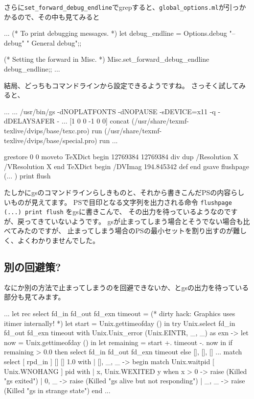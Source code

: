 \documentclass[mingoth,a4paper]{jsarticle}
\begin{document}
さらに\verb|set_forward_debug_endline|でgrepすると、\verb|global_options.ml|が引っかかるので、その中も見てみると

\begin{commandline}
...
(* To print debugging messages. *)
let debug_endline = Options.debug "--debug" " General debug";;

(* Setting the forward in Misc. *)
Misc.set_forward_debug_endline debug_endline;;
...
\end{commandline}

結局、どっちもコマンドラインから設定できるようですね。
さっそく試してみると、

\begin{commandline}
...
...
/usr/bin/gs
-dNOPLATFONTS
-dNOPAUSE
-sDEVICE=x11
-q
-dDELAYSAFER
-
...
[1 0 0 -1 0 0] concat
(/usr/share/texmf-texlive/dvips/base/texc.pro) run
(/usr/share/texmf-texlive/dvips/base/special.pro) run
...

grestore
0 0 moveto
TeXDict begin 12769384 12769384 div dup /Resolution X /VResolution X end
TeXDict begin /DVImag 194.845342 def end
gsave
flushpage (...
) print flush 
\end{commandline}

たしかにgsのコマンドラインらしきものと、それから書きこんだPSの内容らしいものが見えてます。
PSで目印となる文字列を出力される命令 \verb|flushpage (...) print flush| をgsに書きこんで、
その出力を待っているようなのですが、戻ってきていないようです。
gsが止まってしまう場合とそうでない場合も比べてみたのですが、
止まってしまう場合のPSの最小セットを割り出すのが難しく、よくわかりませんでした。

\subsection{別の回避策?}

なにか別の方法で止まってしまうのを回避できないか、とgsの出力を待っている部分も見てみます。

\begin{commandline}
...
let rec select fd_in fd_out fd_exn timeout =
  (* dirty hack: Graphics uses itimer internally! *)
  let start = Unix.gettimeofday () in
  try
    Unix.select fd_in fd_out fd_exn timeout
  with
    Unix.Unix_error (Unix.EINTR, _, _) as exn ->
      let now = Unix.gettimeofday () in
      let remaining = start +. timeout -. now in
      if remaining > 0.0 then select fd_in fd_out fd_exn timeout else [], [], []
...
      match select [ rpd_in ] [] [] 1.0 with
      | [], _, _ ->
          begin match Unix.waitpid [ Unix.WNOHANG ] pid with
          | x, Unix.WEXITED y when x > 0 ->
              raise (Killed "gs exited")
          | 0, _ ->
              raise (Killed "gs alive but not responding")
          | _, _ ->
              raise (Killed "gs in strange state")
          end
...
\end{commandline}
\end{document}
